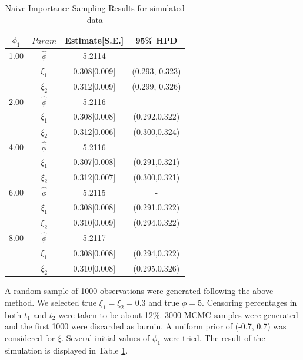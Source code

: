 \documentclass[11pt]{article}
\theoremstyle{remboldstyle}
\begin{document}
\begin{table}[h]
\caption{Naive Importance Sampling Results for simulated data}
\centering
\begin{tabular}{c c c c}
\hline
$\phi_{1}$ & $Param$      & Estimate[S.E.] & 95\% HPD\\
\hline
1.00          & $\hat{\phi}$ & 5.2114              & -\\
              & $\xi_1$      & 0.308[0.009]        & (0.293, 0.323)\\   
              & $\xi_2$      & 0.312[0.009]        & (0.299, 0.326)\\
              \hline 
2.00          & $\hat{\phi}$ & 5.2116              & -\\
              & $\xi_1$      & 0.308[0.008]        & (0.292,0.322)\\   
              & $\xi_2$      & 0.312[0.006]        & (0.300,0.324)\\
              \hline
4.00          & $\hat{\phi}$ & 5.2116              & -\\
              & $\xi_1$      & 0.307[0.008]        & (0.291,0.321)\\   
              & $\xi_2$      & 0.312[0.007]        & (0.300,0.321)\\
              \hline
6.00          & $\hat{\phi}$ & 5.2115              & -\\
              & $\xi_1$      & 0.308[0.008]        & (0.291,0.322)\\   
              & $\xi_2$      & 0.310[0.009]        & (0.294,0.322)\\
              \hline
8.00         & $\hat{\phi}$ & 5.2117              & -\\
              & $\xi_1$      & 0.308[0.008]        & (0.294,0.322)\\   
              & $\xi_2$      & 0.310[0.008]        & (0.295,0.326)\\
              \hline             
\end{tabular}
\label{tab1}
\end{table}
\noindent
A random sample of 1000 observations were generated following the above method. We selected true $\xi_1 = \xi_2 = 0.3$ and true $\phi = 5$. Censoring percentages in both $t_1$ and $t_2$ were taken to be about 12\%. 3000 MCMC samples were generated and the first 1000 were discarded as burnin. A uniform prior of (-0.7, 0.7) was considered for $\xi$.  Several initial values of $\phi_1$ were tried. The result of the simulation is displayed in Table \ref{tab1}.
\end{document}
